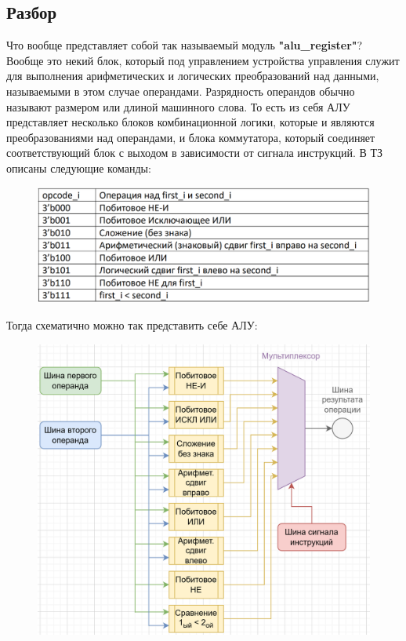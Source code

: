 \documentclass[a4paper,12pt]{article} %
\begin{document}
\subsection{Разбор}
Что вообще представляет собой так называемый модуль \textbf{"alu\_register"}?
Вообще это некий блок, который под управлением устройства управления служит для выполнения арифметических и логических преобразований над данными, называемыми в этом случае операндами. Разрядность операндов обычно называют размером или длиной машинного слова. То есть из себя АЛУ представляет несколько блоков комбинационной логики, которые и являются преобразованиями над операндами, и блока коммутатора, который соединяет соответствующий блок с выходом в зависимости от сигнала инструкций. 
В ТЗ описаны следующие команды:
\begin{figure}[H]
    \centering
    \includegraphics[width=1\linewidth]{Intro/Commands.png}
\end{figure}
Тогда схематично можно так представить себе АЛУ:
\begin{figure}[H]
    \centering
    \includegraphics[width=1\linewidth]{Intro/АЛУ.png}
\end{figure}
\end{document}
